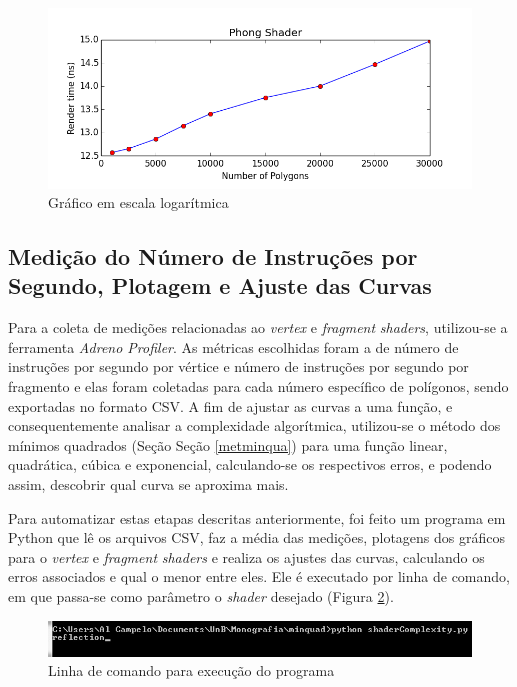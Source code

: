 	\begin{figure}[h]
	\centering
		\includegraphics[keepaspectratio=true,scale=0.6]{figuras/ndk_reta.png}
	\caption{Gráfico em escala logarítmica}
	\label{ndk_reta}
	\end{figure}

\subsection{Medição do Número de Instruções por Segundo, Plotagem e Ajuste das Curvas}

	Para a coleta de medições relacionadas ao \textit{vertex} e \textit{fragment} \textit{shaders}, utilizou-se a ferramenta \textit{Adreno Profiler}. As métricas escolhidas foram a de número de instruções por segundo por vértice e número de instruções por segundo por fragmento e elas foram coletadas para cada número específico de polígonos, sendo exportadas no formato CSV. 	A fim de ajustar as curvas a uma função, e consequentemente analisar a complexidade algorítmica, utilizou-se o método dos mínimos quadrados (Seção Seção \ref{metminqua}) para uma função linear, quadrática, cúbica e exponencial, calculando-se os respectivos erros, e podendo assim, descobrir qual curva se aproxima mais. 

	 Para automatizar estas etapas descritas anteriormente, foi feito um programa em Python que lê os arquivos CSV, faz a média das medições, plotagens dos gráficos para o \textit{vertex} e \textit{fragment} \textit{shaders} e realiza os ajustes das curvas, calculando os erros associados e qual o menor entre eles. Ele é executado por linha de comando, em que passa-se como parâmetro o \textit{shader} desejado (Figura \ref{linhacomando}).

	\begin{figure}[h]
	\centering
		\includegraphics[keepaspectratio=true,scale=1.0]{figuras/linhacomando.jpg}
	\caption{Linha de comando para execução do programa}
	\label{linhacomando}
	\end{figure}


